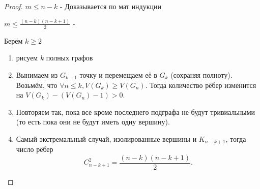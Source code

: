 \documentclass[a4paper, 12pt]{article}
\theoremstyle{definition}
\theoremstyle{definition}
\renewcommand{\leq}{\leqslant}
\renewcommand{\geq}{\geqslant}
\begin{document}
  \begin{proof}
    $m\leq{n-k}$ - Доказывается по мат индукции
    
    $m\leq\frac{(n-k)(n-k+1)}{2}$ - 
    
    Берём $k\geq{2}$
    
    \begin{enumerate}
      \item рисуем $k$ полных графов
      
      \item Вынимаем из $G_{k-1}$ точку и перемещаем её в $G_k$ (сохраняя полноту). Возьмём, что $\forall n\le k, V(G_k)\geq V(G_n)$. Тогда количество рёбер изменится на $V(G_k)-(V(G_n)-1) > 0$.
      \item Повторяем так, пока все кроме последнего подграфа не будут тривиальными (то есть пока они не будут иметь одну вершину).
      \item Самый экстремальный случай, изолированные вершины и $K_{n-k+1}$, тогда число рёбер $$C^2_{n-k+1}=\frac{(n-k)(n-k+1)}{2}.$$ 
    \end{enumerate}
  \end{proof}
  
\end{document}
